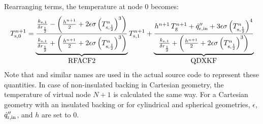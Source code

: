 Rearranging terms, the temperature at node 0 becomes:
\begin{equation}
\label{T0}
  T_{\rm s,0}^{n+1} = \underbrace{\frac{\frac{k_{\rm s,1}}{\delta r_{\frac{1}{2}}}- \left(\frac{h^{n+1}}{2} + 2 \epsilon \sigma \left(T_{\rm s,\frac{1}{2}}^n\right)^3 \right)}{\frac{k_{\rm s,1}}{\delta r_{\frac{1}{2}}} + \left(\frac{h^{n+1}}{2} + 2 \epsilon \sigma \left( T_{\rm s,\frac{1}{2}}^n\right)^3 \right)}}_{\hbox{\ct{RFACF2}}} T_{\rm s,1}^{n+1} +
 \underbrace{ \frac{  h^{n+1} \, T_{\rm g}^{n+1} + \dot{q}_{\rm r,in}'' + 3 \epsilon \sigma \left( T_{\rm s,\frac{1}{2}}^n\right)^4 }{\frac{k_{\rm s,1}}{\delta r_{\frac{1}{2}}}+\left(\frac{h^{n+1}}{2} + 2 \epsilon \sigma \left( T_{\rm s,\frac{1}{2}}^n\right)^3 \right)} }_{\hbox{\ct{QDXKF}}}
\end{equation}
Note that  and similar names are used in the actual source code to represent these quantities.
In case of non-insulated backing in Cartesian geometry, the temperature of virtual node $N+1$ is calculated the same way.
For a Cartesian geometry with an insulated backing or for cylindrical and spherical geometries, $\epsilon$, $\dot{q}_{\rm r,in}''$, and $h$ are set to 0.

